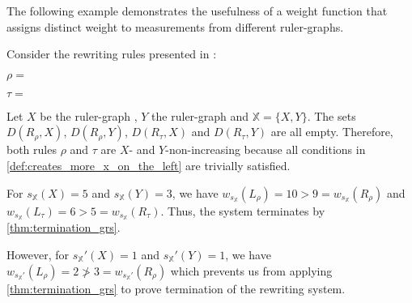 The following example demonstrates the usefulness of a weight function that assigns distinct weight to measurements from different ruler-graphs.
\begin{example} 
    \label{ex:overbeek_5d6}
    Consider the rewriting rules presented in \cite[Example 5.6]{overbeek2024termination_lmcs}:
    \begin{center} 
      $\rho = $\scalebox{0.7}{}
    \end{center}
    \begin{center}
    $\tau = $\scalebox{0.7}{
    }
    \end{center}
     Let $X$ be the ruler-graph
    , $Y$ the ruler-graph
     and $\mathbb{X} = \{X, Y\}$.
    The sets $D(R_\rho, X)$, $D(R_\rho, Y)$, $D(R_\tau, X)$ and $D(R_\tau, Y)$ are all empty. Therefore, both rules $\rho$ and $\tau$ are $X$- and $Y$-non-increasing because all conditions in \autoref{def:creates_more_x_on_the_left} are trivially satisfied.
    
    For $s_\mathbb{X}(X) = 5$ and $s_\mathbb{X}(Y) = 3$, we have $
    w_{s_\mathbb{X}}(L_\rho) = 10 > 9 = w_{s_\mathbb{X}}(R_\rho)
    $ and $
    w_{s_\mathbb{X}}(L_\tau) = 6 > 5 = w_{s_\mathbb{X}}(R_\tau)$.
    Thus, the system terminates by \autoref{thm:termination_grs}.

  However, for $s_\mathbb{X}'(X) = 1$ and $s_\mathbb{X}'(Y) = 1$, we have
    \(
        w_{s_\mathbb{X}'}(L_\rho) = 2 \not > 3 = w_{s_\mathbb{X}'}(R_\rho)
    \) which prevents us from applying \autoref{thm:termination_grs} to prove termination of the rewriting system.
    
\end{example}

 
